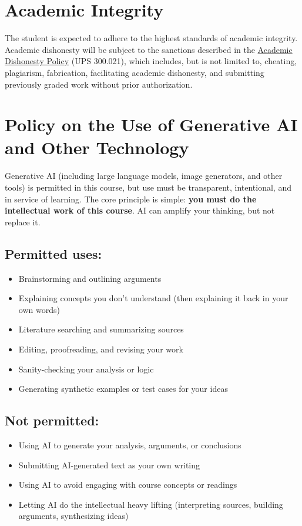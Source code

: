 \documentclass[12pt]{article}
\begin{document}
\section*{Academic Integrity}
The student is expected to adhere to the highest standards of academic integrity. Academic dishonesty will be subject to the sanctions described in the \href{https://www.fullerton.edu/senate/publications_policies_resolutions/ups/UPS\%20300/UPS\%20300.021.pdf}{Academic Dishonesty Policy} (UPS 300.021), which includes, but is not limited to, cheating, plagiarism, fabrication, facilitating academic dishonesty, and submitting previously graded work without prior authorization.

\section*{Policy on the Use of Generative AI and Other Technology}

Generative AI (including large language models, image generators, and other tools) is permitted in this course, but use must be transparent, intentional, and in service of learning. The core principle is simple: \textbf{you must do the intellectual work of this course}. AI can amplify your thinking, but not replace it.

\subsection*{Permitted uses:}
\begin{itemize}
\item Brainstorming and outlining arguments
\item Explaining concepts you don't understand (then explaining it back in your own words)
\item Literature searching and summarizing sources
\item Editing, proofreading, and revising your work
\item Sanity-checking your analysis or logic
\item Generating synthetic examples or test cases for your ideas
\end{itemize}

\subsection*{Not permitted:}
\begin{itemize}
\item Using AI to generate your analysis, arguments, or conclusions
\item Submitting AI-generated text as your own writing
\item Using AI to avoid engaging with course concepts or readings
\item Letting AI do the intellectual heavy lifting (interpreting sources, building arguments, synthesizing ideas)
\end{itemize}
\end{document}
